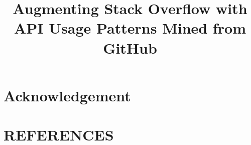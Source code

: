 \documentclass{sig-alternate}
\begin{document}
\title{Augmenting Stack Overflow with API Usage Patterns Mined from GitHub}


\maketitle




\terms{}

\keywords{}









\section{Acknowledgement} 

\section{REFERENCES} 
\balance

%
\renewcommand{\refname}{}
\vspace{-.35in}

\end{document}
